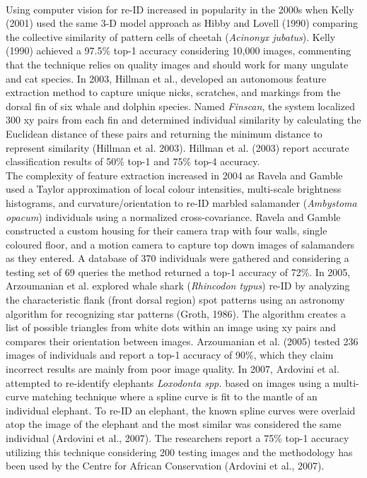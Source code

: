 \documentclass[11pt]{article}
\begin{document}
\newline
\\
Using computer vision for re-ID increased in popularity in the 2000s when Kelly (2001) used the same 3-D model approach as Hibby and Lovell (1990) comparing the collective similarity of pattern cells of cheetah (\textit{Acinonyx jubatus}). Kelly (1990) achieved a 97.5\% top-1 accuracy considering 10,000 images, commenting that the technique relies on quality images and should work for many ungulate and cat species. In 2003, Hillman et al., developed an autonomous feature extraction method to capture unique nicks, scratches, and markings from the dorsal fin of six whale and dolphin species. Named \textit{Finscan}, the system localized 300 xy pairs from each fin and determined individual similarity by calculating the Euclidean distance of these pairs and returning the minimum distance to represent similarity (Hillman et al. 2003). Hillman et al. (2003) report accurate classification results of 50\% top-1 and 75\% top-4 accuracy. 
\newline
\\
The complexity of feature extraction increased in 2004 as Ravela and Gamble used a Taylor approximation of local colour intensities, multi-scale brightness histograms, and curvature/orientation to re-ID marbled salamander (\textit{Ambystoma opacum}) individuals using a normalized cross-covariance. Ravela and Gamble constructed a custom housing for their camera trap with four walls, single coloured floor, and a motion camera to capture top down images of salamanders as they entered. A database of 370 individuals were gathered and considering a testing set of 69 queries the method returned a top-1 accuracy of 72\%. In 2005, Arzoumanian et al. explored whale shark (\textit{Rhincodon typus}) re-ID by analyzing the characteristic flank (front dorsal region) spot patterns using an astronomy algorithm for recognizing star patterns (Groth, 1986). The algorithm creates a list of possible triangles from white dots within an image using xy pairs and compares their orientation between images. Arzoumanian et al. (2005) tested 236 images of individuals and report a top-1 accuracy of 90\%, which they claim incorrect results are mainly from poor image quality. In 2007, Ardovini et al. attempted to re-identify elephants \textit{Loxodonta spp.} based on images using a multi-curve matching technique where a spline curve is fit to the mantle of an individual elephant. To re-ID an elephant, the known spline curves were overlaid atop the image of the elephant and the most similar was considered the same individual (Ardovini et al., 2007). The researchers report a 75\% top-1 accuracy utilizing this technique considering 200 testing images and the methodology has been used by the Centre for African Conservation (Ardovini et al., 2007).
\end{document}
